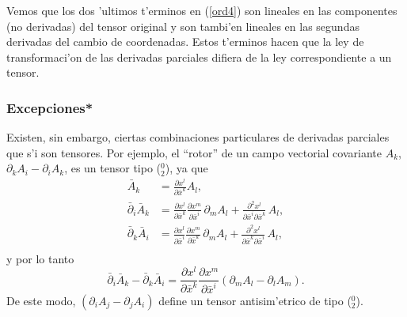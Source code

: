 Vemos que los dos 'ultimos t'erminos en (\ref{ord4}) son lineales en las
componentes (no derivadas) del tensor original y son tambi'en lineales en las segundas derivadas del cambio de coordenadas. Estos t'erminos hacen que la ley de transformaci'on de las derivadas parciales difiera de la ley correspondiente a un tensor.

\subsubsection{Excepciones*}
Existen, sin embargo, ciertas combinaciones particulares de derivadas parciales que s'i son tensores. Por ejemplo, el ``rotor'' de un campo vectorial covariante $A_k $, $\partial_k A_i-\partial_iA_k $, es un tensor tipo ($_2^0$), ya que
\begin{align}
\bar{A}_k  & =\frac{\partial x^l}{\partial\bar{x}^k} A_l ,\label{ord6}\\
\bar{\partial}_i\bar{A}_k  & =\frac{\partial x^l}{\partial\bar{x}^k} 
\frac{\partial x^m}{\partial\bar{x}^i}\, \partial_mA_l +
\frac{\partial^2 x^l}{\partial\bar{x}^i\partial\bar{x}^k}\, A_l ,\\
\bar{\partial}_k \bar{A}_i & =\frac{\partial x^l}{\partial\bar{x}^i}
\frac{\partial x^m}{\partial\bar{x}^k}\, \partial_mA_l +
\frac{\partial^2 x^l}{\partial\bar{x}^k\partial\bar{x}^i}\, A_l ,\\
\end{align}
y por lo tanto
\begin{equation}
 \bar{\partial}_i\bar{A}_k -\bar{\partial}_k \bar{A}_i =\frac{\partial x^l}{\partial\bar{x}^k} \frac{\partial x^m}{\partial\bar{x}^i} \left( \partial_m A_l -\partial_l A_m\right) .
\end{equation}
De este modo, $\left(\partial_iA_j -\partial_j A_i\right)$ define un tensor
antisim'etrico de tipo ($_2^0$).

